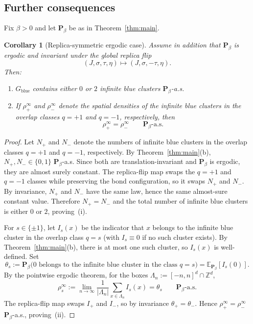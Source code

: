 \documentclass[11pt]{article}
\newtheorem{corollary}[theorem]{Corollary}
\numberwithin{theorem}{section}
\theoremstyle{remark}
\begin{document}
\subsection{Further consequences}\label{sec:bk-consequences}

Fix $\beta > 0$ and let $\mathbf{P}_\beta$ be as in Theorem~\ref{thm:main}.

\begin{corollary}[Replica-symmetric ergodic case]\label{cor:replica-symmetric}
Assume in addition that $\mathbf{P}_\beta$ is ergodic and invariant under the global replica flip
\[
  (J,\sigma,\tau,\eta) \longmapsto (J,\sigma,-\tau,\eta).
\]
Then:
\begin{enumerate}
\item[\textup{(i)}] $G_{\mathrm{blue}}$ contains either $0$ or $2$ infinite blue clusters $\mathbf{P}_\beta$-a.s.
\item[\textup{(ii)}] If $\rho_+^\infty$ and $\rho_-^\infty$ denote the spatial densities of the infinite blue clusters in the overlap classes $q=+1$ and $q=-1$, respectively, then
\[
  \rho_+^\infty = \rho_-^\infty
  \qquad
  \mathbf{P}_\beta\text{-a.s.}
\]
\end{enumerate}
\end{corollary}

\begin{proof}
Let $N_+$ and $N_-$ denote the numbers of infinite blue clusters in the overlap classes $q=+1$ and $q=-1$, respectively.
By Theorem~\ref{thm:main}\textup{(b)}, $N_+,N_- \in \{0,1\}$ $\mathbf{P}_\beta$-a.s.
Since both are translation-invariant and $\mathbf{P}_\beta$ is ergodic, they are almost surely constant.
The replica-flip map swaps the $q=+1$ and $q=-1$ classes while preserving the bond configuration, so it swaps $N_+$ and $N_-$.
By invariance, $N_+$ and $N_-$ have the same law, hence the same almost-sure constant value.
Therefore $N_+ = N_-$ and the total number of infinite blue clusters is either $0$ or $2$, proving~\textup{(i)}.

For $s \in \{\pm1\}$, let $I_s(x)$ be the indicator that $x$ belongs to the infinite blue cluster in the overlap class $q=s$ (with $I_s \equiv 0$ if no such cluster exists).
By Theorem~\ref{thm:main}\textup{(b)}, there is at most one such cluster, so $I_s(x)$ is well-defined.
Set
\[
  \theta_s := \mathbf{P}_\beta\bigl(0 \text{ belongs to the infinite blue cluster in the class } q=s\bigr)
  = \mathbb{E}_{\mathbf{P}_\beta}[I_s(0)].
\]
By the pointwise ergodic theorem, for the boxes $\Lambda_n := [-n,n]^d \cap \mathbb{Z}^d$,
\[
  \rho_s^\infty
  := \lim_{n\to\infty} \frac{1}{|\Lambda_n|}\sum_{x\in\Lambda_n} I_s(x)
  = \theta_s
  \qquad
  \mathbf{P}_\beta\text{-a.s.}
\]
The replica-flip map swaps $I_+$ and $I_-$, so by invariance $\theta_+ = \theta_-$.
Hence $\rho_+^\infty = \rho_-^\infty$ $\mathbf{P}_\beta$-a.s., proving~\textup{(ii)}.
\end{proof}
\end{document}
